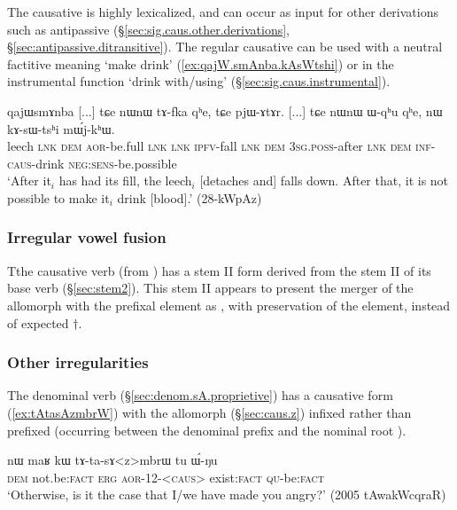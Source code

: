 The causative  is highly lexicalized, and can occur as input for other derivations such as antipassive (§\ref{sec:sig.caus.other.derivations}, §\ref{sec:antipassive.ditransitive}). The regular causative   can be used with a neutral factitive meaning `make drink' (\ref{ex:qajW.smAnba.kAsWtshi}) or in the instrumental function `drink with/using' (§\ref{sec:sig.caus.instrumental}).

\begin{exe} 
\ex \label{ex:qajW.smAnba.kAsWtshi}
\gll qajɯsmɤnba [...] tɕe nɯnɯ tɤ-fka qʰe, tɕe pjɯ-ɤtɤr. [...] tɕe nɯnɯ ɯ-qʰu qʰe, nɯ kɤ-sɯ-tsʰi mɯ́j-kʰɯ. \\
leech { } \textsc{lnk} \textsc{dem} \textsc{aor}-be.full \textsc{lnk} \textsc{lnk} \textsc{ipfv}-fall {  }  \textsc{lnk} \textsc{dem} \textsc{3sg}.\textsc{poss}-after \textsc{lnk} \textsc{dem} \textsc{inf}-\textsc{caus}-drink \textsc{neg}:\textsc{sens}-be.possible \\
\glt `After it$_i$ has had its fill, the leech$_i$ [detaches and] falls down. After that, it is not possible to make it$_i$ drink [blood].' (28-kWpAz)
\end{exe}
 
 
\subsubsection{Irregular vowel fusion} \label{sec:caus.sAG}
Tthe causative verb  (from ) has a stem II form  derived from the stem II  of its base verb (§\ref{sec:stem2}). This stem II appears to present the merger of the  allomorph with the  prefixal element as , with preservation of the  element, instead of expected $\dagger$.


\subsubsection{Other irregularities} \label{sec:sig.caus.irregular.other}
The denominal verb  (§\ref{sec:denom.sA.proprietive}) has a causative form  (\ref{ex:tAtasAzmbrW}) with the  allomorph (§\ref{sec:caus.z}) infixed rather than prefixed (occurring between the denominal  prefix and the nominal root ).

\begin{exe} 
\ex \label{ex:tAtasAzmbrW}
\gll nɯ maʁ kɯ tɤ-ta-sɤ<z>mbrɯ tu ɯ́-ŋu \\
 \textsc{dem} not.be:\textsc{fact} \textsc{erg} \textsc{aor}-1\fl{}2-<\textsc{caus}> exist:\textsc{fact} \textsc{qu}-be:\textsc{fact} \\
 \glt `Otherwise, is it the case that I/we have made you angry?' (2005 tAwakWcqraR)
 \end{exe}
 
